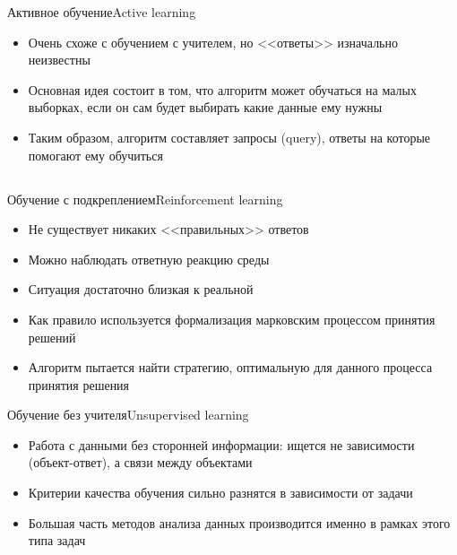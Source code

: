 \documentclass[compress,red,unicode]{beamer}
\begin{document}
\begin{frame}{Активное обучение}{Active learning}
\begin{itemize}
	\item Очень схоже с обучением с учителем, но <<ответы>> изначально неизвестны
	\item Основная идея состоит в том, что алгоритм может обучаться на малых выборках, если он сам будет выбирать какие данные ему нужны
	\item Таким образом, алгоритм составляет запросы (query), ответы на которые помогают ему обучиться 
\end{itemize}
\end{frame}

\subsection{}

\begin{frame}{Обучение с подкреплением}{Reinforcement learning}
\begin{itemize}
	\item Не существует никаких <<правильных>>  ответов
	\item Можно наблюдать ответную реакцию среды
	\item Ситуация достаточно близкая к реальной
	\item Как правило используется формализация марковским процессом принятия решений
	\item Алгоритм пытается найти стратегию, оптимальную для данного процесса принятия решения
\end{itemize}
\end{frame}


\begin{frame}{Обучение без учителя}{Unsupervised learning}
\begin{itemize}
	\item Работа с данными без сторонней информации: ищется не зависимости (объект-ответ), а связи между объектами
	\item Критерии качества обучения сильно разнятся в зависимости от задачи
	\item Большая часть методов анализа данных производится именно в рамках этого типа задач


\end{itemize}
\end{frame}

\subsection{}
\end{document}
